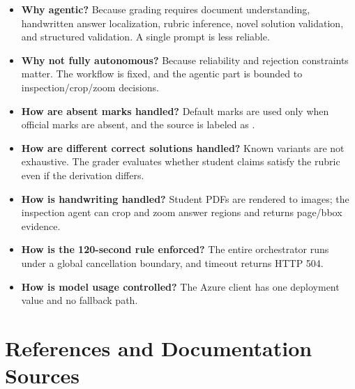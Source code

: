 \documentclass[11pt,a4paper]{article}
\newcommand{\code}[1]{\texttt{\detokenize{#1}}}
\begin{document}
\begin{itemize}[leftmargin=*]
  \item \textbf{Why agentic?} Because grading requires document understanding, handwritten answer localization, rubric inference, novel solution validation, and structured validation. A single prompt is less reliable.
  \item \textbf{Why not fully autonomous?} Because reliability and rejection constraints matter. The workflow is fixed, and the agentic part is bounded to inspection/crop/zoom decisions.
  \item \textbf{How are absent marks handled?} Default marks are used only when official marks are absent, and the source is labeled as \code{system_default}.
  \item \textbf{How are different correct solutions handled?} Known variants are not exhaustive. The grader evaluates whether student claims satisfy the rubric even if the derivation differs.
  \item \textbf{How is handwriting handled?} Student PDFs are rendered to images; the inspection agent can crop and zoom answer regions and returns page/bbox evidence.
  \item \textbf{How is the 120-second rule enforced?} The entire orchestrator runs under a global cancellation boundary, and timeout returns HTTP 504.
  \item \textbf{How is model usage controlled?} The Azure client has one deployment value and no fallback path.
\end{itemize}

\section{References and Documentation Sources}
\end{document}
